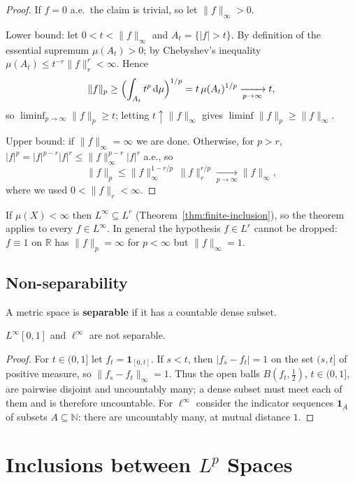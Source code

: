 \documentclass[11pt]{article}
\newcommand{\R}{\mathbb{R}}
\newcommand{\N}{\mathbb{N}}
\newcommand{\norm}[1]{\lVert #1\rVert}
\newcommand{\dmu}{\,\mathrm{d}\mu}
\newcommand{\ind}{\mathbf{1}}
\begin{document}
\begin{proof}
If $f=0$ a.e.\ the claim is trivial, so let $\norm{f}_{\infty}>0$.

Lower bound: let $0<t<\norm{f}_{\infty}$ and $A_{t}=\{|f|>t\}$. By definition of the essential supremum $\mu(A_{t})>0$; by Chebyshev's inequality $\mu(A_{t})\le t^{-r}\norm{f}_{r}^{r}<\infty$. Hence
\[
\norm{f}_{p}\ge\Bigl(\int_{A_{t}}t^{p}\dmu\Bigr)^{1/p}=t\,\mu(A_{t})^{1/p}\xrightarrow[p\to\infty]{}t,
\]
so $\liminf_{p\to\infty}\norm{f}_{p}\ge t$; letting $t\uparrow\norm{f}_{\infty}$ gives $\liminf\norm{f}_{p}\ge\norm{f}_{\infty}$.

Upper bound: if $\norm{f}_{\infty}=\infty$ we are done. Otherwise, for $p>r$, $|f|^{p}=|f|^{p-r}|f|^{r}\le\norm{f}_{\infty}^{p-r}|f|^{r}$ a.e., so
\[
\norm{f}_{p}\le\norm{f}_{\infty}^{1-r/p}\,\norm{f}_{r}^{r/p}\xrightarrow[p\to\infty]{}\norm{f}_{\infty},
\]
where we used $0<\norm{f}_{r}<\infty$.
\end{proof}

If $\mu(X)<\infty$ then $L^{\infty}\subseteq L^{r}$ (Theorem~\ref{thm:finite-inclusion}), so the theorem applies to every $f\in L^{\infty}$. In general the hypothesis $f\in L^{r}$ cannot be dropped: $f\equiv1$ on $\R$ has $\norm{f}_{p}=\infty$ for $p<\infty$ but $\norm{f}_{\infty}=1$.

\subsection{Non-separability}

A metric space is \textbf{separable} if it has a countable dense subset.

\begin{proposition}\label{prop:Linfty-nonsep}
$L^{\infty}[0,1]$ and $\ell^{\infty}$ are not separable.
\end{proposition}

\begin{proof}
For $t\in(0,1]$ let $f_{t}=\ind_{[0,t]}$. If $s<t$, then $|f_{s}-f_{t}|=1$ on the set $(s,t]$ of positive measure, so $\norm{f_{s}-f_{t}}_{\infty}=1$. Thus the open balls $B(f_{t},\frac12)$, $t\in(0,1]$, are pairwise disjoint and uncountably many; a dense subset must meet each of them and is therefore uncountable. For $\ell^{\infty}$ consider the indicator sequences $\ind_{A}$ of subsets $A\subseteq\N$: there are uncountably many, at mutual distance $1$.
\end{proof}

\section{Inclusions between $L^{p}$ Spaces}
\end{document}

